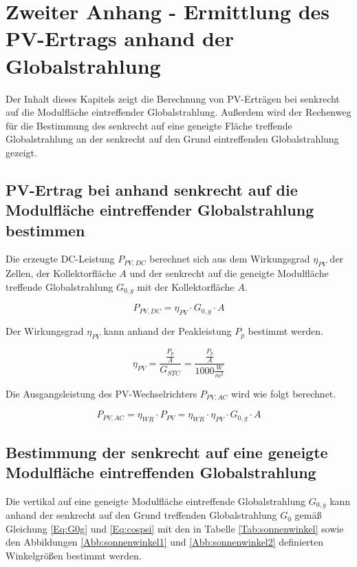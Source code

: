\chapter{Zweiter Anhang - Ermittlung des PV-Ertrags anhand der Globalstrahlung}
\label{Kap:Anhang2}
Der Inhalt dieses Kapitels zeigt die Berechnung von PV-Erträgen bei senkrecht auf die Modulfläche eintreffender Globalstrahlung. Außerdem wird der Rechenweg für die Bestimmung des senkrecht auf eine geneigte Fläche treffende Globalstrahlung an der senkrecht auf den Grund eintreffenden Globalstrahlung gezeigt.

  \section{PV-Ertrag bei anhand senkrecht auf die Modulfläche eintreffender Globalstrahlung bestimmen}
      \label{Kap:PV_global}
      Die erzeugte DC-Leistung $P_{PV,DC}$ berechnet sich aus dem Wirkungsgrad $\eta_{PV}$ der Zellen, der Kollektorfläche $A$ und der senkrecht auf die geneigte Modulfläche treffende Globalstrahlung $G_{0,g}$ mit der Kollektorfläche $A$.
	
      \begin{equation}
          P_{PV,DC} = \eta_{PV} \cdot G_{0,g} \cdot A
          \label{Eq:PV_Pdc}
      \end{equation}

      Der Wirkungsgrad $\eta_{PV}$ kann anhand der Peakleistung $P_p$ bestimmt werden.

      \begin{equation}
          \eta_{PV} = \frac{\frac{P_p}{A}}{G_{STC}} = \frac{\frac{P_p}{A}}{1000 \frac{W}{m^2}}
          \label{Eq:PV_eta}
      \end{equation}

      Die Ausgangsleistung des PV-Wechselrichters $P_{PV,AC}$ wird wie folgt berechnet.

      \begin{equation}
          P_{PV,AC} = \eta_{WR} \cdot P_{PV} = \eta_{WR} \cdot \eta_{PV} \cdot G_{0,g} \cdot A
          \label{Eq:PV_Pac}
      \end{equation}

	\section{Bestimmung der senkrecht auf eine geneigte Modulfläche eintreffenden Globalstrahlung}	
    	\label{Kap:G0g}
		Die vertikal auf eine geneigte Modulfläche eintreffende Globalstrahlung $G_{0,g}$ kann anhand der senkrecht auf den Grund treffenden Globalstrahlung $G_0$ gemäß Gleichung \ref{Eq:G0g} und \ref{Eq:cospsi} mit den in Tabelle \ref{Tab:sonnenwinkel} sowie den Abbildungen \ref{Abb:sonnenwinkel1} und \ref{Abb:sonnenwinkel2} definierten Winkelgrößen bestimmt werden.\cite{REN2}
        
